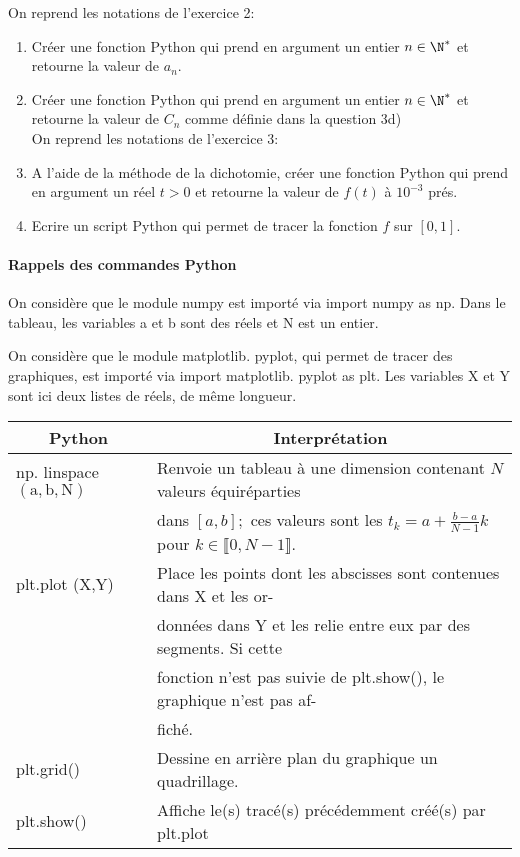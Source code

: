 \documentclass[a4paper, 11pt,reqno]{article}
\begin{document}
\vspace{1cm}
\begin{exercice}



On reprend les notations de l'exercice 2:
\begin{enumerate}

\item Créer une fonction Python qui prend en argument un entier $n\in \N^*$ et  retourne la valeur de $a_n$.
\item  Créer une fonction Python qui prend en argument un entier $n\in \N^*$ et  retourne la valeur de $C_n$ comme définie dans la question 3d)\\


On reprend les notations de l'exercice 3:


\item A l'aide de la méthode de la dichotomie, créer une fonction Python qui prend en argument un réel $t>0$ et  retourne la valeur de $f(t)$ à $10^{-3}$ prés.

\item Ecrire un script Python qui permet de tracer la fonction $f$ sur $[0,1]$.
\end{enumerate}
\end{exercice}

\paragraph{Rappels des commandes Python}
On considère que le module numpy est importé via import numpy as np. Dans le tableau, les variables a et b sont des réels et $\mathrm{N}$ est un entier.

On considère que le module matplotlib. pyplot, qui permet de tracer des graphiques, est importé via import matplotlib. pyplot as plt. Les variables X et Y sont ici deux listes de réels, de même longueur.\\

\hspace{-1cm}
\begin{tabular}{ll}
\hline
\multicolumn{1}{c}{Python} & \multicolumn{1}{c}{Interprétation} \\
\hline
$\mathrm{np}.$ linspace $(\mathrm{a}, \mathrm{b}, \mathrm{N})$ & Renvoie un tableau à une dimension contenant $N$ valeurs équiréparties \\ &
 dans $[a, b] ;$ ces valeurs sont les $t_{k}=a+\frac{b-a}{N-1} k$
 pour $k \in \llbracket 0, N-1 \rrbracket .$ \\
\hline
plt.plot (X,Y) & Place les points dont les abscisses sont contenues dans X et les or- \\
 & données dans Y et les relie entre eux par des segments. Si cette \\
 & fonction n'est pas suivie de plt.show(), le graphique n'est pas af- \\
 & fiché. \\
plt.grid() & Dessine en arrière plan du graphique un quadrillage. \\
plt.show() & Affiche le(s) tracé(s) précédemment créé(s) par plt.plot \\
\hline
\end{tabular}
\vspace{0.3cm}
\end{document}
